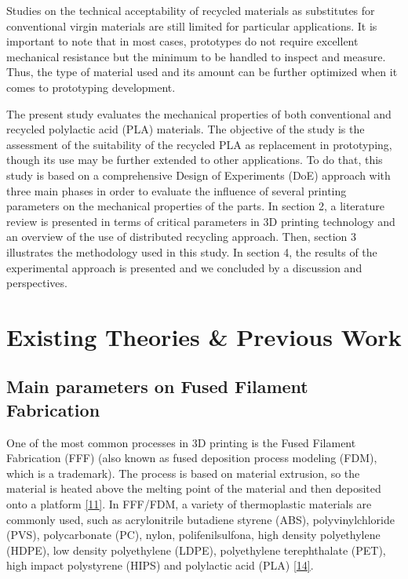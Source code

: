 \documentclass[conference,final,]{IEEEtran}
\begin{document}
Studies on the technical acceptability of recycled materials as
substitutes for conventional virgin materials are still limited for
particular applications. It is important to note that in most cases,
prototypes do not require excellent mechanical resistance but the
minimum to be handled to inspect and measure. Thus, the type of material
used and its amount can be further optimized when it comes to
prototyping development.

The present study evaluates the mechanical properties of both
conventional and recycled polylactic acid (PLA) materials. The objective
of the study is the assessment of the suitability of the recycled PLA as
replacement in prototyping, though its use may be further extended to
other applications. To do that, this study is based on a comprehensive
Design of Experiments (DoE) approach with three main phases in order to
evaluate the influence of several printing parameters on the mechanical
properties of the parts. In section 2, a literature review is presented
in terms of critical parameters in 3D printing technology and an
overview of the use of distributed recycling approach. Then, section 3
illustrates the methodology used in this study. In section 4, the
results of the experimental approach is presented and we concluded by a
discussion and perspectives.

\hypertarget{existing-theories-previous-work}{%
\section{Existing Theories \& Previous
Work}\label{existing-theories-previous-work}}

\hypertarget{main-parameters-on-fused-filament-fabrication}{%
\subsection{Main parameters on Fused Filament
Fabrication}\label{main-parameters-on-fused-filament-fabrication}}

One of the most common processes in 3D printing is the Fused Filament
Fabrication (FFF) (also known as fused deposition process modeling
(FDM), which is a trademark). The process is based on material
extrusion, so the material is heated above the melting point of the
material and then deposited onto a platform
\protect\hyperlink{ref-Wolszczak2018}{{[}11{]}}. In FFF/FDM, a variety
of thermoplastic materials are commonly used, such as acrylonitrile
butadiene styrene (ABS), polyvinylchloride (PVS), polycarbonate (PC),
nylon, polifenilsulfona, high density polyethylene (HDPE), low density
polyethylene (LDPE), polyethylene terephthalate (PET), high impact
polystyrene (HIPS) and polylactic acid (PLA)
\protect\hyperlink{ref-Singh2018e}{{[}14{]}}.
\end{document}
